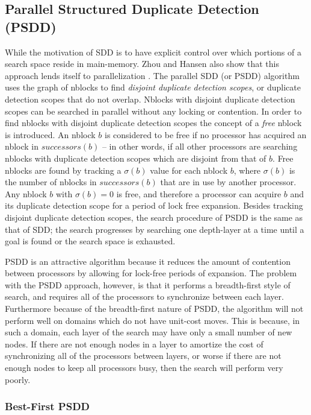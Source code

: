 \documentclass{article}
\begin{document}
\subsection{Parallel Structured Duplicate Detection (PSDD)}

While the motivation of SDD is to have explicit control over which
portions of a search space reside in main-memory.  Zhou and Hansen
also show that this approach lends itself to parallelization
\cite{zhou:psd}.  The parallel SDD (or PSDD) algorithm uses the graph
of nblocks to find \emph{disjoint duplicate detection scopes}, or
duplicate detection scopes that do not overlap.  Nblocks with disjoint
duplicate detection scopes can be searched in parallel without any
locking or contention.  In order to find nblocks with disjoint
duplicate detection scopes the concept of a \emph{free} nblock is
introduced.  An nblock $b$ is considered to be free if no processor
has acquired an nblock in $successors(b)$ -- in other words, if all
other processors are searching nblocks with duplicate detection scopes
which are disjoint from that of $b$.  Free nblocks are found by
tracking a $\sigma(b)$ value for each nblock $b$, where $\sigma(b)$ is
the number of nblocks in $successors(b)$ that are in use by another
processor.  Any nblock $b$ with $\sigma(b) = 0$ is free, and therefore
a processor can acquire $b$ and its duplicate detection scope for a
period of lock free expansion.  Besides tracking disjoint duplicate
detection scopes, the search procedure of PSDD is the same as that of
SDD; the search progresses by searching one depth-layer at a time
until a goal is found or the search space is exhausted.

PSDD is an attractive algorithm because it reduces the amount of
contention between processors by allowing for lock-free periods of
expansion.  The problem with the PSDD approach, however, is that it
performs a breadth-first style of search, and requires all of the
processors to synchronize between each layer.  Furthermore because of
the breadth-first nature of PSDD, the algorithm will not perform well
on domains which do not have unit-cost moves.  This is because, in
such a domain, each layer of the search may have only a small number
of new nodes.  If there are not enough nodes in a layer to amortize
the cost of synchronizing all of the processors between layers, or
worse if there are not enough nodes to keep all processors busy, then
the search will perform very poorly.

\subsubsection{Best-First PSDD}
\end{document}
